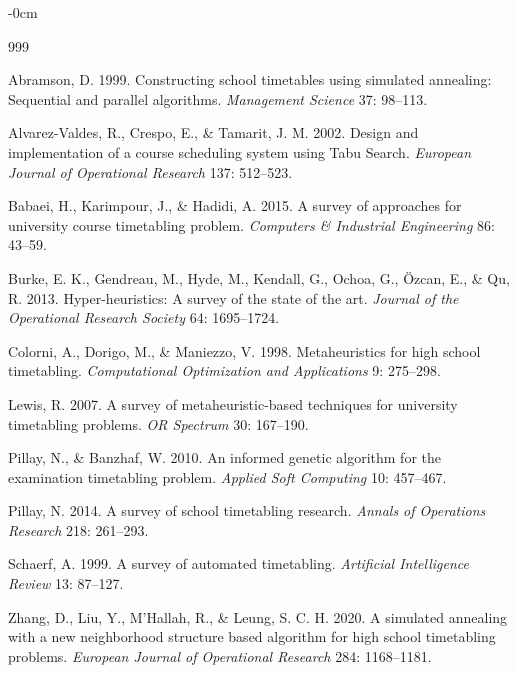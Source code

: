 \documentclass[algorithms,article,submit,pdftex,moreauthors]{Definitions/mdpi}
\begin{document}
\begin{adjustwidth}{-\extralength}{0cm}


\begin{thebibliography}{999}

Abramson, D. 1999. Constructing school timetables using simulated annealing: Sequential and parallel algorithms. \textit{Management Science} 37: 98--113.

Alvarez-Valdes, R., Crespo, E., \& Tamarit, J. M. 2002. Design and implementation of a course scheduling system using Tabu Search. \textit{European Journal of Operational Research} 137: 512--523.

Babaei, H., Karimpour, J., \& Hadidi, A. 2015. A survey of approaches for university course timetabling problem. \textit{Computers \& Industrial Engineering} 86: 43--59.

Burke, E. K., Gendreau, M., Hyde, M., Kendall, G., Ochoa, G., Özcan, E., \& Qu, R. 2013. Hyper-heuristics: A survey of the state of the art. \textit{Journal of the Operational Research Society} 64: 1695--1724.

Colorni, A., Dorigo, M., \& Maniezzo, V. 1998. Metaheuristics for high school timetabling. \textit{Computational Optimization and Applications} 9: 275--298.

Lewis, R. 2007. A survey of metaheuristic-based techniques for university timetabling problems. \textit{OR Spectrum} 30: 167--190.

Pillay, N., \& Banzhaf, W. 2010. An informed genetic algorithm for the examination timetabling problem. \textit{Applied Soft Computing} 10: 457--467.

Pillay, N. 2014. A survey of school timetabling research. \textit{Annals of Operations Research} 218: 261--293.

Schaerf, A. 1999. A survey of automated timetabling. \textit{Artificial Intelligence Review} 13: 87--127.

Zhang, D., Liu, Y., M'Hallah, R., \& Leung, S. C. H. 2020. A simulated annealing with a new neighborhood structure based algorithm for high school timetabling problems. \textit{European Journal of Operational Research} 284: 1168--1181.

\end{thebibliography}

\end{adjustwidth}
\end{document}
